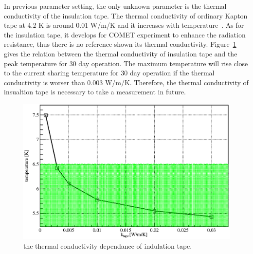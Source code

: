 In previous parameter setting, the only unknown parameter is the thermal conductivity of the insulation tape.
The thermal conductivity of ordinary Kapton tape at 4.2 K is around 0.01 W/m/K and it increases with temperature~\cite{rss90}.
As for the insulation tape, it develops for COMET experiment to enhance the radiation resistance, thus there is no reference shown its thermal conductivity.
Figure~\ref{4tape} gives the relation between the thermal conductivity of insulation tape and the peak temperature for 30 day operation.
The maximum temperature will rise close to the current sharing temperature for 30 day operation if the thermal conductivity is worser than 0.003 W/m/K.
Therefore, the thermal conductivity of insualtion tape is necessary to take a measurement in future.
 \begin{figure}[H]
  \centering
  \includegraphics[scale=0.45]{chapter6/fig/tape.eps}
  \caption{ the thermal conductivity dependance of indulation tape.}
  \label{4tape}
 \end{figure}

